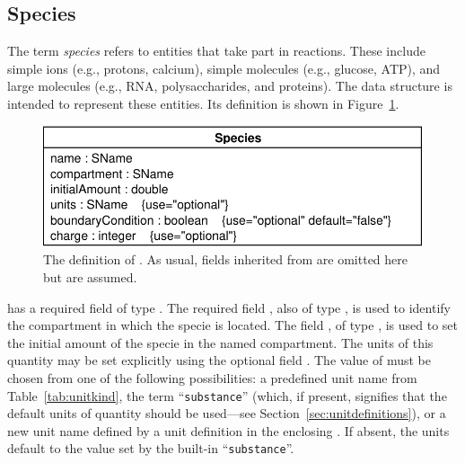 \documentclass[10pt]{cekarticle}
\newcommand{\vref}[1]{\ref{#1}}
\newcommand{\changed}[1]{\textcolor{BrickRed}{#1}}
\begin{document}
\subsection{Species}
\label{sec:species}

The term \emph{species} refers to entities that take part in reactions.
These include simple ions (e.g., protons, calcium), simple molecules (e.g.,
glucose, ATP), and large molecules (e.g., RNA, polysaccharides, and
proteins).  The  data structure is intended to represent
these entities.  Its definition is shown in Figure~\vref{fig:species}.

\begin{figure}[htb]
  \centering
  \vspace*{5pt}
  \includegraphics[scale = 0.65]{species}
  \caption{The definition of .  As usual, fields inherited from
     are omitted here but are assumed.}
  \label{fig:species}
\end{figure}

 has a required  field of type .
The required field , also of type , is
used to identify the compartment in which the specie is located.  The field
, of type , is used to set the initial
amount of the specie in the named compartment.  The units of \changed{this
  quantity may be set explicitly using the optional field \attrib{units}.
  The value of \attrib{units} must be chosen from one of the following
  possibilities: a predefined unit name from Table~\ref{tab:unitkind}, the
  term ``\texttt{substance}'' (which, if present, signifies that the
  default} \changed{units of quantity should be used---see
  Section~\ref{sec:unitdefinitions}), or a new unit name defined by a unit
  definition in the enclosing \class{Model}.  If absent, the units default
  to the value set by the built-in ``\texttt{substance}''.}
\end{document}
